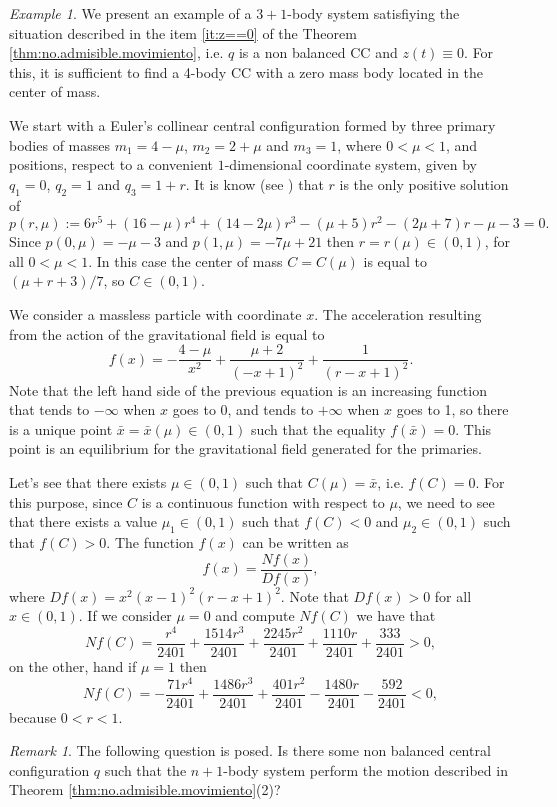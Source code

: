 \documentclass[twoside]{article}
\theoremstyle{remark}
\newtheorem{comentario}{Remark}
\newtheorem{ejemplo}{Example}
\newcounter{example}
\begin{document}
\begin{ejemplo}
 We present an example of a $3+1$-body system satisfiying the situation described in the item \ref{it:z==0} of the Theorem \ref{thm:no.admisible.movimiento}, i.e. $q$ is a non balanced CC and $z(t)\equiv 0$. For this, it is sufficient to find a 4-body CC with a zero mass body located in the center of mass.

 We start with a Euler's collinear central configuration formed by three primary bodies of masses $m_1 = 4-\mu$, $m_2 = 2 + \mu$ and $m_3 = 1$, where $0<\mu<1$, and positions, respect to a convenient $1$-dimensional coordinate system,  given by $q_1 = 0$, $q_2 = 1$ and $q_3 = 1 + r$. It is know (see \cite{Moeckel:2014}) that $r$ is the only positive solution of
\[
p(r,\mu):=6 r^{5} +\left(16- \mu \right) r^{4}  +  \left( 14- 2 \mu \right) r^{3}- \left( \mu + 5\right)  r^{2}-\left( 2 \mu + 7\right) r - \mu - 3=0.
\]
Since  $p(0,\mu)=-\mu-3$ and $p(1,\mu)=-7\mu+21$ then $r=r(\mu)\in (0,1)$, for all $0<\mu<1$.
In this case the center of mass $C=C(\mu)$ is equal to $(\mu+r+3)/7$, so $C\in (0,1)$.

We consider a massless particle with coordinate $x$. The acceleration resulting from the action of the gravitational field is equal to
\[
f(x)= - \frac{4-\mu }{x^{2}}+\frac{\mu + 2}{\left(- x + 1\right)^{2}} + \frac{1}{\left(r - x + 1\right)^{2}}.
\]
Note that the left hand side of the previous equation is an increasing function that tends to $-\infty$ when $x$ goes to 0, and tends to $+\infty$ when $x$ goes to 1, so there is a unique point $\bar{x}=\bar{x}(\mu)\in (0,1)$ such that the equality $f(\bar{x})=0$. This point is an equilibrium for the gravitational field generated for the primaries.

Let's see that there exists $ \mu \in (0,1) $ such that $ C(\mu) = \bar{x} $, i.e. $f(C)=0$. For this purpose, since $C$ is a continuous function with respect to $\mu$,  we need to see that there exists a value $\mu_1\in (0,1)$ such that $f (C) <0$  and   $ \mu_2\in (0,1) $ such that $ f (C)> 0 $.  The function $f(x)$ can be written as $$f(x)=\frac{Nf(x)}{Df(x)},$$ where $Df(x)=x^{2} \left(x - 1\right)^{2} \left(r - x + 1\right)^{2}$. Note that  $Df(x)>0$ for all $x\in (0,1)$. If we consider $\mu=0$ and compute $Nf(C)$ we have that
\[Nf(C)=\frac{r^{4}}{2401} + \frac{1514 r^{3}}{2401} + \frac{2245 r^{2}}{2401} + \frac{1110 r}{2401} + \frac{333}{2401}>0,\]
on the other, hand if  $\mu=1$ then
\[Nf(C)=- \frac{71 r^{4}}{2401} + \frac{1486 r^{3}}{2401} + \frac{401 r^{2}}{2401} - \frac{1480 r}{2401} - \frac{592}{2401}<0,\]
because $0<r<1$.
\end{ejemplo}

\begin{comentario}
 The following question is posed. Is there some non balanced central configuration $q$ such that the $n+1$-body system perform the motion described in Theorem \ref{thm:no.admisible.movimiento}(2)?
\end{comentario}





 
\end{document}
